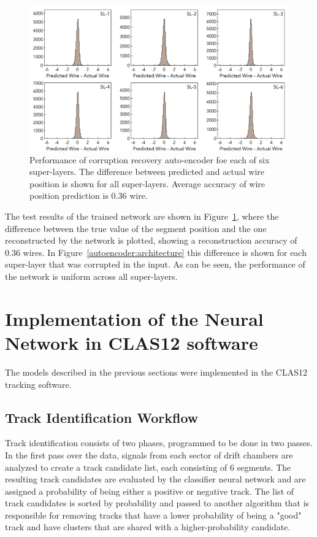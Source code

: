 \documentclass[aps,prl,preprint,12pt]{elsarticle}
\begin{document}
 \begin{figure}[!ht]
\begin{center}
\includegraphics[width=6.0in]{images/encoder_performance.pdf}
\caption {Performance of corruption recovery auto-encoder foe each of six super-layers. The difference between predicted and actual 
wire position is shown for all super-layers. Average accuracy of wire position prediction is  $0.36$ wire.}
 \label{autoencoder:performance}
 \end{center}
\end{figure}

The test results of the trained network are shown in Figure~\ref{autoencoder:performance}, where the 
difference between the true value of the segment position and the one reconstructed by the network is 
plotted, showing a reconstruction accuracy of $0.36$ wires. In Figure~\ref{autoencoder:architecture} 
this difference is shown for each super-layer that was corrupted in the input. As can be seen, 
the performance of the network is uniform across all super-layers.

\section{Implementation of the Neural Network in CLAS12 software}

The models described in the previous sections were implemented in the CLAS12 tracking software. 

\subsection{Track Identification Workflow}

 Track identification consists of two phases, programmed to be done in two passes. In the first pass 
 over the data, signals from each sector of drift chambers are analyzed to create a track candidate list, 
 each consisting of 6 segments. The resulting track candidates are evaluated by the classifier neural 
 network and are assigned a probability of being either a positive or negative track. The list of track 
 candidates is sorted by probability and passed to another algorithm that is responsible for removing 
 tracks that have a lower probability of being a "good" track and have clusters that are shared with a 
 higher-probability candidate. 
\end{document}
